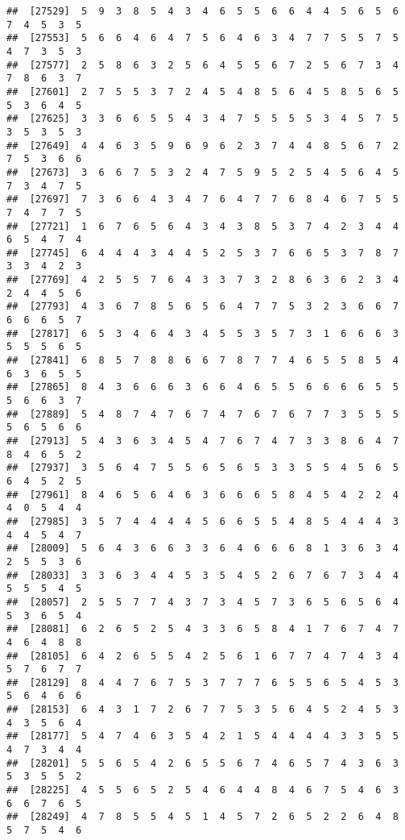 \documentclass[
]{book}
\begin{document}
\begin{verbatim}
##  [27529]  5  9  3  8  5  4  3  4  6  5  5  6  6  4  4  5  6  5  6  7  4  5  3  5
##  [27553]  5  6  6  4  6  4  7  5  6  4  6  3  4  7  7  5  5  7  5  4  7  3  5  3
##  [27577]  2  5  8  6  3  2  5  6  4  5  5  6  7  2  5  6  7  3  4  7  8  6  3  7
##  [27601]  2  7  5  5  3  7  2  4  5  4  8  5  6  4  5  8  5  6  5  5  3  6  4  5
##  [27625]  3  3  6  6  5  5  4  3  4  7  5  5  5  5  3  4  5  7  5  3  5  3  5  3
##  [27649]  4  4  6  3  5  9  6  9  6  2  3  7  4  4  8  5  6  7  2  7  5  3  6  6
##  [27673]  3  6  6  7  5  3  2  4  7  5  9  5  2  5  4  5  6  4  5  7  3  4  7  5
##  [27697]  7  3  6  6  4  3  4  7  6  4  7  7  6  8  4  6  7  5  5  7  4  7  7  5
##  [27721]  1  6  7  6  5  6  4  3  4  3  8  5  3  7  4  2  3  4  4  6  5  4  7  4
##  [27745]  6  4  4  4  3  4  4  5  2  5  3  7  6  6  5  3  7  8  7  3  3  4  2  3
##  [27769]  4  2  5  5  7  6  4  3  3  7  3  2  8  6  3  6  2  3  4  2  4  4  5  6
##  [27793]  4  3  6  7  8  5  6  5  6  4  7  7  5  3  2  3  6  6  7  6  6  6  5  7
##  [27817]  6  5  3  4  6  4  3  4  5  5  3  5  7  3  1  6  6  6  3  5  5  5  6  5
##  [27841]  6  8  5  7  8  8  6  6  7  8  7  7  4  6  5  5  8  5  4  6  3  6  5  5
##  [27865]  8  4  3  6  6  6  3  6  6  4  6  5  5  6  6  6  6  5  5  5  6  6  3  7
##  [27889]  5  4  8  7  4  7  6  7  4  7  6  7  6  7  7  3  5  5  5  5  6  5  6  6
##  [27913]  5  4  3  6  3  4  5  4  7  6  7  4  7  3  3  8  6  4  7  8  4  6  5  2
##  [27937]  3  5  6  4  7  5  5  6  5  6  5  3  3  5  5  4  5  6  5  6  4  5  2  5
##  [27961]  8  4  6  5  6  4  6  3  6  6  6  5  8  4  5  4  2  2  4  4  0  5  4  4
##  [27985]  3  5  7  4  4  4  4  5  6  6  5  5  4  8  5  4  4  4  3  4  4  5  4  7
##  [28009]  5  6  4  3  6  6  3  3  6  4  6  6  6  8  1  3  6  3  4  2  5  5  3  6
##  [28033]  3  3  6  3  4  4  5  3  5  4  5  2  6  7  6  7  3  4  4  5  5  5  4  5
##  [28057]  2  5  5  7  7  4  3  7  3  4  5  7  3  6  5  6  5  6  4  5  3  6  5  4
##  [28081]  6  2  6  5  2  5  4  3  3  6  5  8  4  1  7  6  7  4  7  4  6  4  8  8
##  [28105]  6  4  2  6  5  5  4  2  5  6  1  6  7  7  4  7  4  3  4  5  7  6  7  7
##  [28129]  8  4  4  7  6  7  5  3  7  7  7  6  5  5  6  5  4  5  3  5  6  4  6  6
##  [28153]  6  4  3  1  7  2  6  7  7  5  3  5  6  4  5  2  4  5  3  4  3  5  6  4
##  [28177]  5  4  7  4  6  3  5  4  2  1  5  4  4  4  4  3  3  5  5  4  7  3  4  4
##  [28201]  5  5  6  5  4  2  6  5  5  6  7  4  6  5  7  4  3  6  3  5  3  5  5  2
##  [28225]  4  5  5  6  5  2  5  4  6  4  4  8  4  6  7  5  4  6  3  6  6  7  6  5
##  [28249]  4  7  8  5  5  4  5  1  4  5  7  2  6  5  2  2  6  4  8  5  7  5  4  6

\end{verbatim}
\end{document}
